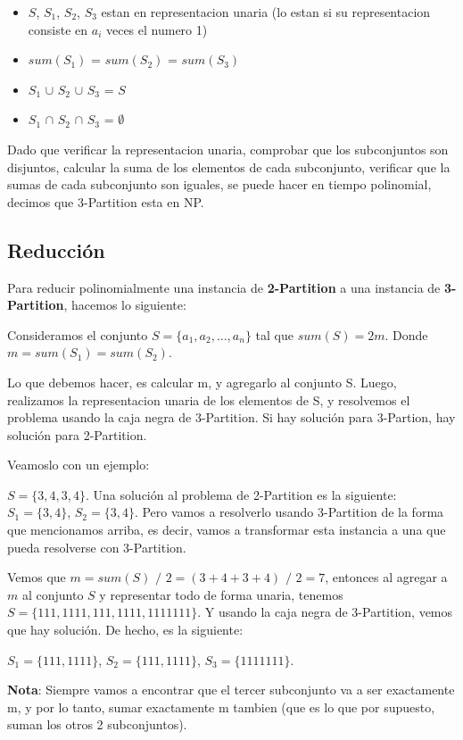 \begin{itemize}
    \item $S$, $S_1$, $S_2$, $S_3$ estan en representacion unaria (lo estan si su representacion consiste en $a_i$ veces el numero 1)
    \item $sum(S_1)$ = $sum(S_2)$ = $sum(S_3)$
    \item $S_1$ $\cup$ $S_2$ $\cup$ $S_3$ = $S$
    \item $S_1$ $\cap$ $S_2$ $\cap$ $S_3$ = $\emptyset$
\end{itemize}

Dado que verificar la representacion unaria, comprobar que los subconjuntos son disjuntos, calcular la suma de los elementos de cada subconjunto, verificar que la sumas de cada subconjunto son iguales, se puede hacer en tiempo polinomial, decimos que 3-Partition esta en NP.

\subsection*{Reducción}

Para reducir polinomialmente una instancia de \textbf{2-Partition} a una instancia de \textbf{3-Partition}, hacemos lo siguiente:

Consideramos el conjunto \( S = \{a_1, a_2, \dots, a_n\} \) tal que $sum(S) = 2m$. Donde $m = sum(S_1) = sum(S_2)$.

Lo que debemos hacer, es calcular m, y agregarlo al conjunto S. Luego, realizamos la representacion unaria de los elementos de S, y resolvemos el problema usando la caja negra de 3-Partition. Si hay solución para 3-Partion, hay solución para 2-Partition.

Veamoslo con un ejemplo:

$S = \{3, 4, 3, 4\}$. Una solución al problema de 2-Partition es la siguiente: $S_1 = \{3, 4\}$, $S_2 = \{3, 4\}$. Pero vamos a resolverlo usando 3-Partition de la forma que mencionamos arriba, es decir, vamos a transformar esta instancia a una que pueda resolverse con 3-Partition.

Vemos que $m = sum(S)$ $/$ $2 = (3 + 4 + 3 + 4)$ $/$ $2 = 7$, entonces al agregar a $m$ al conjunto $S$ y representar todo de forma unaria, tenemos $S = \{111, 1111, 111, 1111, 1111111\}$. Y usando la caja negra de 3-Partition, vemos que hay solución. De hecho, es la siguiente:

$S_1 = \{111, 1111\}$, $S_2 = \{111, 1111\}$, $S_3 = \{1111111\}$.

\textbf{Nota}: Siempre vamos a encontrar que el tercer subconjunto va a ser exactamente m, y por lo tanto, sumar exactamente m tambien (que es lo que por supuesto, suman los otros 2 subconjuntos).

